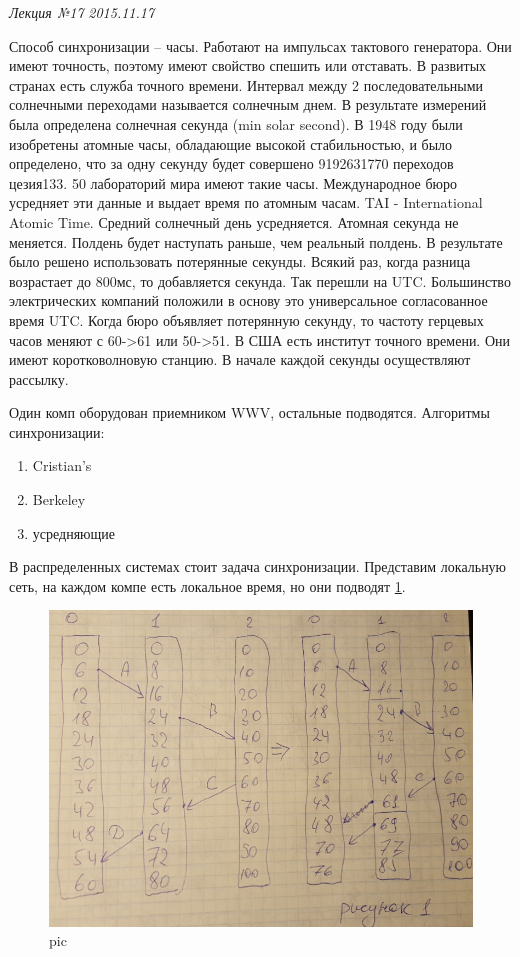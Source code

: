 \clearpage
\begin{flushright}
	\textit{Лекция №17}
	\textit{2015.11.17}
\end{flushright}

Способ синхронизации – часы. Работают на импульсах тактового генератора. Они имеют точность, поэтому имеют свойство спешить или отставать.
В развитых странах есть служба точного времени.
Интервал между 2 последовательными солнечными переходами называется солнечным днем. В результате измерений была определена солнечная секунда (min solar second). В 1948 году были изобретены атомные часы, обладающие высокой стабильностью, и было определено, что за одну секунду будет совершено 9192631770 переходов цезия133. 50 лабораторий мира имеют такие часы. Международное бюро усредняет эти данные и выдает время по атомным часам. TAI - International Atomic Time.
Средний солнечный день усредняется. Атомная секунда не меняется. Полдень будет наступать раньше, чем реальный полдень. В результате было решено использовать потерянные секунды. Всякий раз, когда разница возрастает до 800мс, то добавляется секунда. Так перешли на UTC. 
Большинство электрических компаний положили в основу это универсальное согласованное время UTC. Когда бюро объявляет потерянную секунду, то частоту герцевых часов меняют с 60->61 или 50->51.
В  США есть институт точного времени. Они имеют коротковолновую станцию. В начале каждой секунды осуществляют рассылку. 

Один комп оборудован приемником WWV, остальные подводятся.
Алгоритмы  синхронизации:
\begin{enumerate}
    \item Cristian’s
    \item Berkeley
    \item усредняющие
\end{enumerate} 

В распределенных системах стоит задача синхронизации. Представим локальную сеть, на каждом компе есть локальное время, но они подводят \ref{pic:trable_sync}.

\begin{figure}[H]
    \centering
    \includegraphics[width=\textwidth]{pic/1.png}
    \caption{pic}
    \label{pic:trable_sync}
\end{figure}

